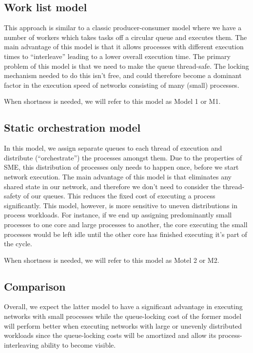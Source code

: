 
\subsection{Work list model}
This approach is similar to a classic producer-consumer model where we
have a number of workers which takes tasks off a circular queue and
executes them. The main advantage of this model is that it allows
processes with different execution times to ``interleave'' leading to
a lower overall execution time. The primary problem of this model is
that we need to make the queue thread-safe. The locking mechanism
needed to do this isn't free, and could therefore become a dominant
factor in the execution speed of networks consisting of many (small)
processes.

When shortness is needed, we will refer to this model as Model 1 or M1.

\subsection{Static orchestration model}
In this model, we assign separate queues to each thread of execution
and distribute (``orchestrate'') the processes amongst them. Due to
the properties of SME, this distribution of processes only needs to
happen once, before we start network execution. The main advantage of
this model is that eliminates any shared state in our network, and
therefore we don't need to consider the thread-safety of our
queues. This reduces the fixed cost of executing a process
significantly. This model, however, is more sensitive to uneven
distributions in process workloads. For instance, if we end up
assigning predominantly small processes to one core and large
processes to another, the core executing the small processes would be
left idle until the other core has finished executing it's part of the
cycle.

When shortness is needed, we will refer to this model as Motel 2 or M2.

\subsection{Comparison}
Overall, we expect the latter model to have a significant advantage in
executing networks with small processes while the queue-locking cost
of the former model will perform better when executing networks with
large or unevenly distributed workloads since the queue-locking costs
will be amortized and allow its process-interleaving ability to become
visible.

